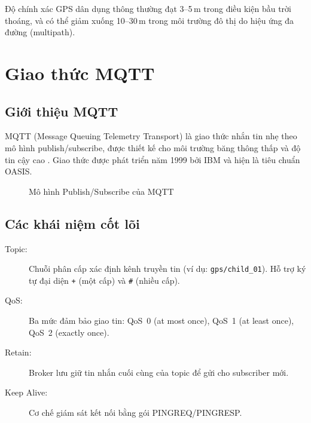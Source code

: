 \documentclass[13pt, a4paper]{report}
\begin{document}
Độ chính xác GPS dân dụng thông thường đạt 3--5\,m trong điều kiện bầu trời thoáng, và có thể giảm xuống 10--30\,m trong môi trường đô thị do hiệu ứng đa đường (multipath).

\section{Giao thức MQTT}

\subsection{Giới thiệu MQTT}

MQTT (Message Queuing Telemetry Transport) là giao thức nhắn tin nhẹ theo mô hình publish/subscribe, được thiết kế cho môi trường băng thông thấp và độ tin cậy cao \cite{banks2019mqtt}. Giao thức được phát triển năm 1999 bởi IBM và hiện là tiêu chuẩn OASIS.

\begin{figure}[H]
\centering
{}
\caption{Mô hình Publish/Subscribe của MQTT}
\label{fig:mqtt_model}
\end{figure}

\subsection{Các khái niệm cốt lõi}

\begin{description}
  \item[Topic:] Chuỗi phân cấp xác định kênh truyền tin (ví dụ: \texttt{gps/child\_01}). Hỗ trợ ký tự đại diện \texttt{+} (một cấp) và \texttt{\#} (nhiều cấp).
  \item[QoS:] Ba mức đảm bảo giao tin: QoS~0 (at most once), QoS~1 (at least once), QoS~2 (exactly once).
  \item[Retain:] Broker lưu giữ tin nhắn cuối cùng của topic để gửi cho subscriber mới.
  \item[Keep Alive:] Cơ chế giám sát kết nối bằng gói PINGREQ/PINGRESP.
\end{description}
\end{document}
